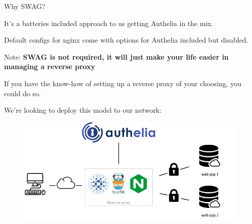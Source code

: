 \documentclass{beamer}
\begin{document}
\begin{frame}
    \begin{center}
        Why SWAG?
        \vspace{5mm}\par\noindent
    \end{center}
\end{frame}

\begin{frame}
    \begin{center}
        It's a batteries included approach to us getting Authelia in the mix.
        \vspace{5mm}\par\noindent
        Default configs for nginx come with options for Authelia included but disabled.
    \end{center}
\end{frame}

\begin{frame}
    \begin{center}
        Note: \textbf{SWAG is not required, it will just make your life easier in managing a reverse proxy}
        \vspace{5mm}\par\noindent
        If you have the know-how of setting up a reverse proxy of your choosing, you could do so.
        
    \end{center}
\end{frame}

\begin{frame}
    We're looking to deploy this model to our network:
    \begin{figure}
        \centering
        \includegraphics[width=\textwidth,keepaspectratio]{../resources/archi.png}
    \end{figure}
\end{frame}
\end{document}
